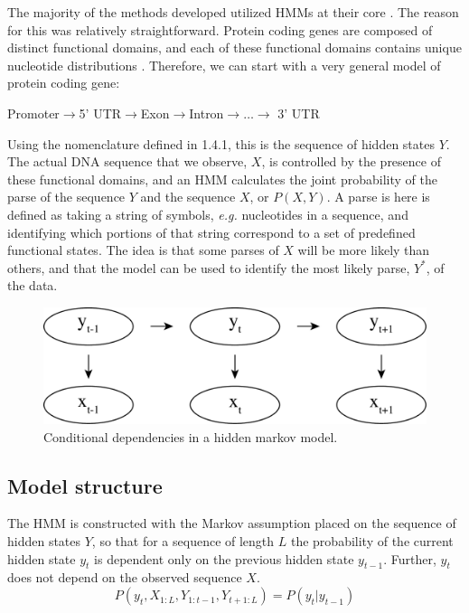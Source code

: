 The majority of the methods developed utilized HMMs at their core \cite{Burge1997PredictionDNA,Pachter2002ApplicationsProblems,Henderson1997FindingModel}. The reason for this was relatively straightforward. Protein coding genes are composed of distinct functional domains, and each of these functional domains contains unique nucleotide distributions \cite{Burge1997PredictionDNA,Pachter2002ApplicationsProblems,Henderson1997FindingModel}. Therefore, we can start with a very general model of protein coding gene:

\begin{center}
    Promoter$\rightarrow$5' UTR$\rightarrow$Exon$\rightarrow$Intron$\rightarrow \dots \rightarrow$ 3' UTR
\end{center}

Using the nomenclature defined in 1.4.1, this is the sequence of hidden states $Y$. The actual DNA sequence that we observe, $X$, is controlled by the presence of these functional domains, and an HMM calculates the joint probability of the parse of the sequence $Y$ and the sequence $X$, or $P(X,Y)$. A parse is here is defined as taking a string of symbols, \textit{e.g.} nucleotides in a sequence, and identifying which portions of that string correspond to a set of predefined functional states. The idea is that some parses of $X$ will be more likely than others, and that the model can be used to identify the most likely parse, $Y^*$, of the data. 
\begin{figure}[h]
\centering
\includegraphics[width=.75\textwidth]{images/hmm.pdf}
\caption{Conditional dependencies in a hidden markov model.}
\label{fig:HMM}
\end{figure}
\subsection{Model structure}
The HMM is constructed with the Markov assumption placed on the sequence of hidden states $Y$, so that for a sequence of length $L$ the probability of the current hidden state $y_t$ is dependent only on the previous hidden state $y_{t-1}$. Further, $y_t$ does not depend on the observed sequence $X$. 
\begin{equation}
    P(y_t,X_{1:L},Y_{1:t-1},Y_{t+1:L}) = P(y_t|y_{t-1})
\end{equation}


